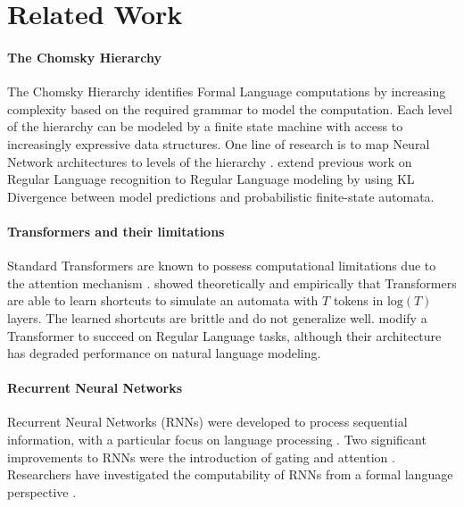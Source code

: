     \section{Related Work}
    
    \paragraph{The Chomsky Hierarchy}
    The Chomsky Hierarchy \citep{chomsky_three_1956, chomsky_certain_1959} identifies Formal Language computations by increasing complexity based on the required grammar to model the computation. Each level of the hierarchy can be modeled by a finite state machine with access to increasingly expressive data structures. One line of research is to map Neural Network architectures to levels of the hierarchy \citep{bhattamishra_ability_2020, deletang_neural_2022, strobl_what_2024}. \citet{borenstein_what_2024} extend previous work on Regular Language recognition to Regular Language modeling by using KL Divergence between model predictions and probabilistic finite-state automata.
    
    \paragraph{Transformers and their limitations}
    Standard Transformers are known to possess computational limitations due to the attention mechanism \citep{merrill_parallelism_2023, strobl_what_2024}. \citet{liu_transformers_2022} showed theoretically and empirically that Transformers are able to learn shortcuts to simulate an automata with $T$ tokens in $\text{log}(T)$ layers. The learned shortcuts are brittle and do not generalize well. \citet{chi_transformer_2023} modify a Transformer to succeed on Regular Language tasks, although their architecture has degraded performance on natural language modeling. 
    
    \paragraph{Recurrent Neural Networks}
    Recurrent Neural Networks (RNNs) were developed to process sequential information, with a particular focus on language processing \citep{jordan_serial_1997, elman_finding_1990}. Two significant improvements to RNNs were the introduction of gating \citep{hochreiter_long_1997, cho_learning_2014} and attention \citep{bahdanau_neural_2015}. Researchers have investigated the computability of RNNs from a formal language perspective \citep{siegelmann_computational_1995, chen_recurrent_2018, nowak_representational_2023, svete_recurrent_2023}.
    
